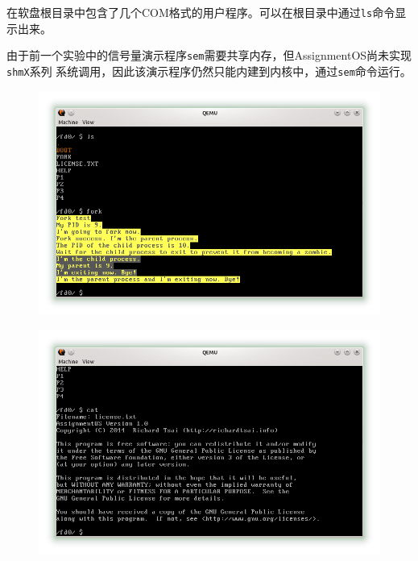 \documentclass[a4paper, adobefonts]{ctexart}
\begin{document}
在软盘根目录中包含了几个COM格式的用户程序。可以在根目录中通过\verb|ls|命令显示出来。

由于前一个实验中的信号量演示程序\verb|sem|需要共享内存，但AssignmentOS尚未实现\verb|shmX|系列
系统调用，因此该演示程序仍然只能内建到内核中，通过\verb|sem|命令运行。

\begin{figure}[htp!]
    \center\includegraphics[scale=0.72]{2.png}
\end{figure}

\begin{figure}[htp!]
    \center\includegraphics[scale=0.72]{3.png}
\end{figure}
\end{document}
